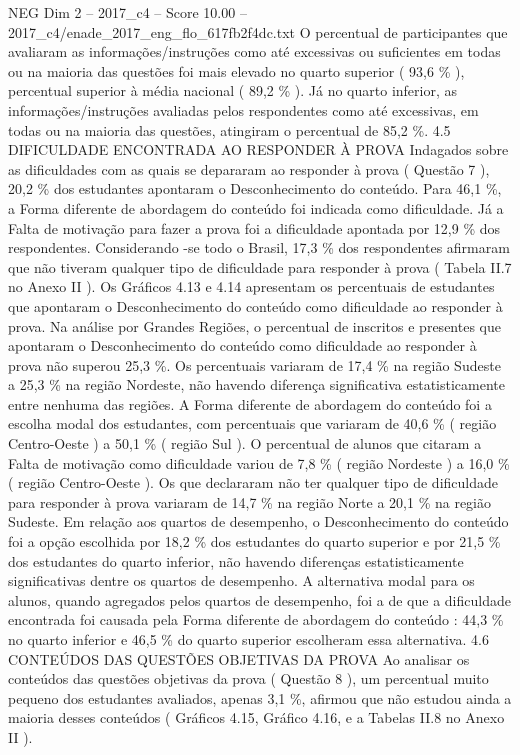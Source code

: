 \begin{textsample}{NEG Dim 2 – 2017\_c4 – Score 10.00 – 2017\_c4/enade\_2017\_eng\_flo\_617fb2f4dc.txt}
O percentual de participantes que avaliaram as informações/instruções como até excessivas ou suficientes em todas ou na maioria das questões foi mais elevado no quarto superior ( 93,6 \% ), percentual superior à média nacional ( 89,2 \% ).
Já no quarto inferior, as informações/instruções avaliadas pelos respondentes como até excessivas, em todas ou na maioria das questões, atingiram o percentual de 85,2 \%. 4.5 DIFICULDADE ENCONTRADA AO RESPONDER À PROVA Indagados sobre as dificuldades com as quais se depararam ao responder à prova ( Questão 7 ), 20,2 \% dos estudantes apontaram o Desconhecimento do conteúdo.
Para 46,1 \%, a Forma diferente de abordagem do conteúdo foi indicada como dificuldade.
Já a Falta de motivação para fazer a prova foi a dificuldade apontada por 12,9 \% dos respondentes.
Considerando -se todo o Brasil, 17,3 \% dos respondentes afirmaram que não tiveram qualquer tipo de dificuldade para responder à prova ( Tabela II.7 no Anexo II ).
Os Gráficos 4.13 e 4.14 apresentam os percentuais de estudantes que apontaram o Desconhecimento do conteúdo como dificuldade ao responder à prova.
Na análise por Grandes Regiões, o percentual de inscritos e presentes que apontaram o Desconhecimento do conteúdo como dificuldade ao responder à prova não superou 25,3 \%.
Os percentuais variaram de 17,4 \% na região Sudeste a 25,3 \% na região Nordeste, não havendo diferença significativa estatisticamente entre nenhuma das regiões.
A Forma diferente de abordagem do conteúdo foi a escolha modal dos estudantes, com percentuais que variaram de 40,6 \% ( região Centro-Oeste ) a 50,1 \% ( região Sul ).
O percentual de alunos que citaram a Falta de motivação como dificuldade variou de 7,8 \% ( região Nordeste ) a 16,0 \% ( região Centro-Oeste ).
Os que declararam não ter qualquer tipo de dificuldade para responder à prova variaram de 14,7 \% na região Norte a 20,1 \% na região Sudeste.
Em relação aos quartos de desempenho, o Desconhecimento do conteúdo foi a opção escolhida por 18,2 \% dos estudantes do quarto superior e por 21,5 \% dos estudantes do quarto inferior, não havendo diferenças estatisticamente significativas dentre os quartos de desempenho.
A alternativa modal para os alunos, quando agregados pelos quartos de desempenho, foi a de que a dificuldade encontrada foi causada pela Forma diferente de abordagem do conteúdo : 44,3 \% no quarto inferior e 46,5 \% do quarto superior escolheram essa alternativa. 4.6 CONTEÚDOS DAS QUESTÕES OBJETIVAS DA PROVA Ao analisar os conteúdos das questões objetivas da prova ( Questão 8 ), um percentual muito pequeno dos estudantes avaliados, apenas 3,1 \%, afirmou que não estudou ainda a maioria desses conteúdos ( Gráficos 4.15, Gráfico 4.16, e a Tabelas II.8 no Anexo II ).

\end{textsample}
